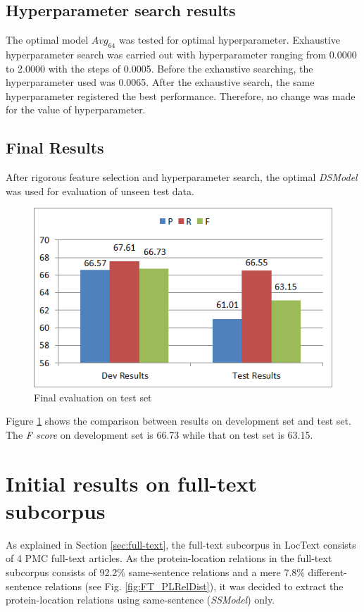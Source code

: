 \subsection{Hyperparameter search results}

The optimal model $Avg_{64}$ was tested for optimal hyperparameter. Exhaustive hyperparameter search was carried out with hyperparameter ranging from 0.0000 to 2.0000 with the steps of 0.0005. Before the exhaustive searching, the hyperparameter used was 0.0065. After the exhaustive search, the same hyperparameter registered the best performance. Therefore, no change was made for the value of hyperparameter.

\subsection{Final Results}

After rigorous feature selection and hyperparameter search, the optimal \textit{DSModel} was used for evaluation of unseen test data.

\begin{figure}
\centering
\includegraphics[scale=0.7]{figures/DSFinalResults.png}
\caption{Final evaluation on test set}\label{fig:DSFinal}
\end{figure}

Figure \ref{fig:DSFinal} shows the comparison between results on development set and test set. The \textit{F score} on development set is 66.73 while that on test set is 63.15.

\section{Initial results on full-text subcorpus} \label{sec:FTPrimaryRes}

As explained in Section \ref{sec:full-text}, the full-text subcorpus in LocText consists of 4 PMC \cite{pmc} full-text articles. As the protein-location relations in the full-text subcorpus consists of 92.2\% same-sentence relations and a mere 7.8\% different-sentence relations (see Fig. \ref{fig:FT_PLRelDist}), it was decided to extract the protein-location relations using same-sentence (\textit{SSModel}) only.

